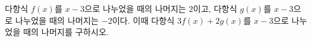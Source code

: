 다항식 $f(x)$를 $x-3$으로 나누었을 때의 나머지는 $2$이고, 다항식 $g(x)$를 $x-3$으로 나누었을 때의 나머지는 $-2$이다. 이때 다항식 $3f(x)+2g(x)$를 $x-3$으로 나누었을 때의 나머지를 구하시오.
